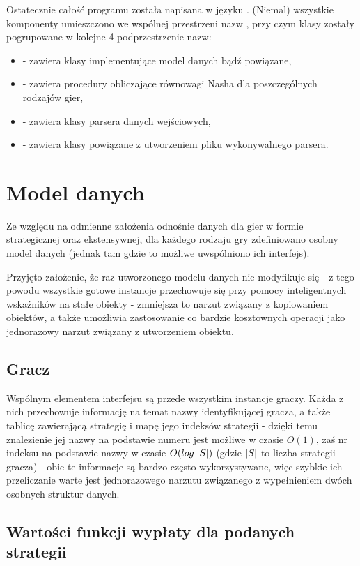 \documentclass[polish]{standalone}
\begin{document}
Ostatecznie całość programu została napisana w języku . (Niemal) wszystkie komponenty umieszczono we wspólnej
przestrzeni nazw , przy czym klasy zostały pogrupowane w kolejne 4 podprzestrzenie nazw:
\begin{itemize}
\item {} - zawiera klasy implementujące model danych bądź powiązane,
\item {} - zawiera procedury obliczające równowagi Nasha dla poszczególnych rodzajów gier,
\item {} - zawiera klasy parsera danych wejściowych,
\item {} - zawiera klasy powiązane z utworzeniem pliku wykonywalnego parsera.
\end{itemize}

\section{Model danych}

Ze względu na odmienne założenia odnośnie danych dla gier w formie strategicznej oraz ekstensywnej, dla każdego rodzaju
gry zdefiniowano osobny model danych (jednak tam gdzie to możliwe uwspólniono ich interfejs).

Przyjęto założenie, że raz utworzonego modelu danych nie modyfikuje się - z tego powodu wszystkie gotowe instancje
przechowuje się przy pomocy inteligentnych wskaźników na stałe obiekty - zmniejsza to narzut związany z kopiowaniem
obiektów, a także umożliwia zastosowanie co bardzie kosztownych operacji jako jednorazowy narzut związany z utworzeniem
obiektu.

\subsection{Gracz}

Wspólnym elementem interfejsu są przede wszystkim instancje graczy. Każda z nich przechowuje informację na temat nazwy
identyfikującej gracza, a także tablicę zawierającą strategię i mapę jego indeksów strategii - dzięki temu znalezienie
jej nazwy na podstawie numeru jest możliwe w czasie $O(1)$, zaś nr indeksu na podstawie nazwy w czasie 
$O(log\;|S|)$ (gdzie $|S|$ to liczba strategii gracza) - obie te informacje są bardzo często wykorzystywane,
więc szybkie ich przeliczanie warte jest jednorazowego narzutu związanego z wypełnieniem dwóch osobnych struktur danych.

\subsection{Wartości funkcji wypłaty dla podanych strategii}
\end{document}
